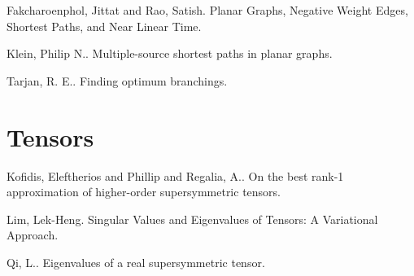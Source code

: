 \documentclass{article}
\begin{document}
\bitem
\item Fakcharoenphol, Jittat and Rao, Satish. Planar Graphs, Negative Weight Edges, Shortest Paths, and Near Linear Time. \cite{FakcharoenpholPlanar} 
\item Klein, Philip N.. Multiple-source shortest paths in planar graphs. \cite{KleinMultiplesource} 
\item Tarjan, R. E.. Finding optimum branchings. \cite{Tarjan1977Finding} 
\eitem

\section{ Tensors} 

\bitem
\item Kofidis, Eleftherios and Phillip and Regalia, A.. On the best rank-1 approximation of higher-order supersymmetric tensors. \cite{Kofidis2002Best} 
\item Lim, Lek-Heng. Singular Values and Eigenvalues of Tensors: A Variational Approach. \cite{Lim2006Singular} 
\item Qi, L.. Eigenvalues of a real supersymmetric tensor. \cite{Qi2005Eigenvalues} \eitem
\end{document}
